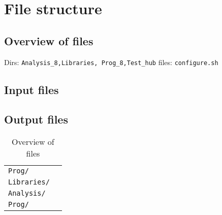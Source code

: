 \section{File structure}\label{sec:files}

\subsection{Overview of files}
Dirs: \texttt{Analysis\_8,Libraries, Prog\_8,Test\_hub}
files: \texttt{configure.sh}



\subsection{Input files}

\subsection{Output files}
%
\begin{table}[h]
   \begin{tabular}{l l}
  \texttt{Prog/} & \\
  \texttt{Libraries/} & \\  
  \texttt{Analysis/} & \\
      
  \texttt{Prog/} & \\      
   \end{tabular}
   \caption{   Overview of files
    \label{table:files}}
\end{table}
%
